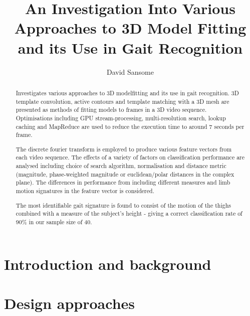 \documentclass[a4paper,12pt]{report}
\title{An Investigation Into Various Approaches to 3D Model Fitting and its Use in Gait Recognition}
\author{David Sansome}
\begin{document}


\maketitle

\begin{abstract}
	Investigates various approaches to 3D modelfitting and its use in gait recognition.
	3D template convolution, active contours and template matching with a 3D mesh are presented as methods of fitting models to frames in a 3D video sequence.
	Optimisations including GPU stream-processing, multi-resolution search, lookup caching and MapReduce are used to reduce the execution time to around 7 seconds per frame.
	
	The discrete fourier transform is employed to produce various feature vectors from each video sequence.
	The effects of a variety of factors on classification performance are analysed including choice of search algorithm, normalisation and distance metric (magnitude, phase-weighted magnitude or euclidean/polar distances in the complex plane).
	The differences in performance from including different measures and limb motion signatures in the feature vector is considered.
	
	The most identifiable gait signature is found to consist of the motion of the thighs combined with a measure of the subject's height - giving a correct classification rate of 90\% in our sample size of 40.
\end{abstract}

\newpage

\tableofcontents

\chapter{Introduction and background}

\clearpage
\clearpage


\chapter{Design approaches}

\clearpage
\clearpage
\clearpage
\clearpage
\clearpage
\clearpage
\clearpage

\end{document}
